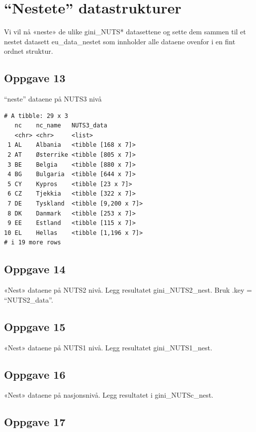 \documentclass[
  a4paper,
]{article}
\begin{document}
\section{``Nestete'' datastrukturer}\label{nestete-datastrukturer}

Vi vil nå «neste» de ulike gini\_NUTS* datasettene og sette dem sammen
til et nestet datasett eu\_data\_nestet som innholder alle dataene
ovenfor i en fint ordnet struktur.

\subsection{Oppgave 13}\label{oppgave-13}

``neste'' dataene på NUTS3 nivå

\begin{verbatim}
# A tibble: 29 x 3
   nc    nc_name   NUTS3_data          
   <chr> <chr>     <list>              
 1 AL    Albania   <tibble [168 x 7]>  
 2 AT    Østerrike <tibble [805 x 7]>  
 3 BE    Belgia    <tibble [880 x 7]>  
 4 BG    Bulgaria  <tibble [644 x 7]>  
 5 CY    Kypros    <tibble [23 x 7]>   
 6 CZ    Tjekkia   <tibble [322 x 7]>  
 7 DE    Tyskland  <tibble [9,200 x 7]>
 8 DK    Danmark   <tibble [253 x 7]>  
 9 EE    Estland   <tibble [115 x 7]>  
10 EL    Hellas    <tibble [1,196 x 7]>
# i 19 more rows
\end{verbatim}

\subsection{Oppgave 14}\label{oppgave-14}

«Nest» dataene på NUTS2 nivå. Legg resultatet gini\_NUTS2\_nest. Bruk
.key = ``NUTS2\_data''.

\subsection{Oppgave 15}\label{oppgave-15}

«Nest» dataene på NUTS1 nivå. Legg resultatet gini\_NUTS1\_nest.

\subsection{Oppgave 16}\label{oppgave-16}

«Nest» dataene på nasjonsnivå. Legg resultatet i gini\_NUTSc\_nest.

\subsection{Oppgave 17}\label{oppgave-17}
\end{document}
